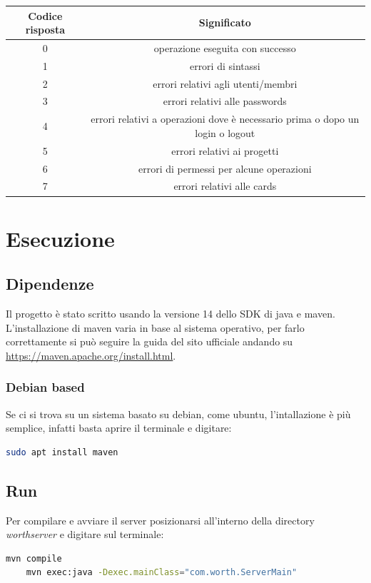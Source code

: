 \documentclass[11pt]{report}
\begin{document}
	\begin{center}
		\begin{tabular}{ |c|c| } 
			\hline
			Codice risposta & Significato \\
			\hline\hline
			0	& operazione eseguita con successo \\
			\hline
			1	& errori di sintassi \\
			\hline
			2	& errori relativi agli utenti/membri \\
			\hline
			3	& errori relativi alle passwords \\
			\hline
			4	& errori relativi a operazioni dove è necessario prima o dopo un login o logout \\
			\hline
			5	& errori relativi ai progetti \\
			\hline
			6	& errori di permessi per alcune operazioni \\
			\hline
			7	& errori relativi alle cards \\
			\hline
		\end{tabular}
	\end{center}

	\chapter{Esecuzione}
	
	\section{Dipendenze}
	Il progetto è stato scritto usando la versione 14 dello SDK di java e maven.\\
	L'installazione di maven varia in base al sistema operativo, per farlo correttamente si può seguire la guida del sito ufficiale andando su  \href{https://maven.apache.org/install.html}{https://maven.apache.org/install.html}.
	
	\subsection{Debian based}
	Se ci si trova su un sistema basato su debian, come ubuntu, l'intallazione è più semplice, infatti basta aprire il terminale e digitare:
	\begin{lstlisting}[language=bash]
	sudo apt install maven
	\end{lstlisting}

	
	\section{Run}
	Per compilare e avviare il server posizionarsi all'interno della directory \textit{worthserver} e digitare sul terminale:
	\begin{lstlisting}[language=bash]
	mvn compile
	mvn exec:java -Dexec.mainClass="com.worth.ServerMain"
	\end{lstlisting}
	
\end{document}
